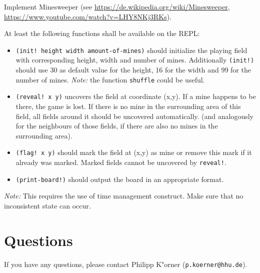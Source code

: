 \documentclass[11pt,a4paper]{article}
\begin{document}
\begin{exercise}[Minesweeper]
Implement Minesweeper (see \url{https://de.wikipedia.org/wiki/Minesweeper}, \url{https://www.youtube.com/watch?v=LHY8NKj3RKs}). 

At least the following functions shall be available on the REPL:

\begin{itemize}
\item \texttt{(init! height width amount-of-mines)} should initialize the playing field with corresponding height, width and number of mines.
Additionally \texttt{(init!)} should use 30 as default value for the height, 16 for the width and 99 for the number of mines.
\emph{Note:} the function \verb|shuffle| could be useful.
\item \texttt{(reveal! x y)} uncovers the field at coordinate (x,y). If a mine happens to be there, the game is lost.
If there is no mine in the surrounding area of this field, all fields around it should be uncovered automatically.
(and analogously for the neighbours of those fields, if there are also no mines in the surrounding area).
\item \texttt{(flag! x y)} should mark the field at (x,y) as mine or remove this mark if it already was marked.
Marked fields cannot be uncovered by \texttt{reveal!}.
\item \texttt{(print-board!)} should output the board in an appropriate format.
\end{itemize}

\emph{Note:} This requires the use of time management construct. Make sure that no inconsistent state can occur.

\end{exercise}


\section*{Questions}
If you have any questions, please contact Philipp K"orner (\texttt{p.koerner@hhu.de}).
\end{document}
